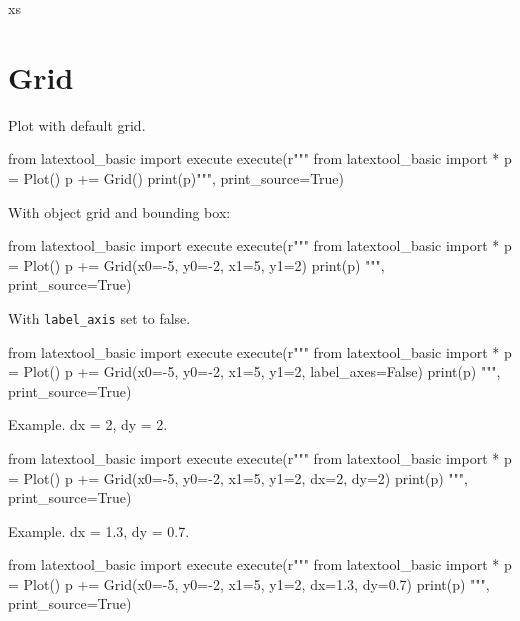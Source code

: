 xs\section{Grid}

Plot with default grid.
\begin{python}
from latextool_basic import execute
execute(r"""
from latextool_basic import *
p = Plot()
p += Grid()
print(p)""", print_source=True)
\end{python}


With object grid and bounding box:
\begin{python}
from latextool_basic import execute
execute(r"""
from latextool_basic import *
p = Plot()
p += Grid(x0=-5, y0=-2, x1=5, y1=2)
print(p)
""", print_source=True)
\end{python}


With \verb!label_axis! set to false.
\begin{python}
from latextool_basic import execute
execute(r"""
from latextool_basic import *
p = Plot()
p += Grid(x0=-5, y0=-2, x1=5, y1=2, label_axes=False)
print(p)
""", print_source=True)
\end{python}




Example. dx = 2, dy = 2.
\begin{python}
from latextool_basic import execute
execute(r"""
from latextool_basic import *
p = Plot()
p += Grid(x0=-5, y0=-2, x1=5, y1=2, dx=2, dy=2)
print(p)
""", print_source=True)
\end{python}




Example. dx = 1.3, dy = 0.7.
\begin{python}
from latextool_basic import execute
execute(r"""
from latextool_basic import *
p = Plot()
p += Grid(x0=-5, y0=-2, x1=5, y1=2, dx=1.3, dy=0.7)
print(p)
""", print_source=True)
\end{python}

